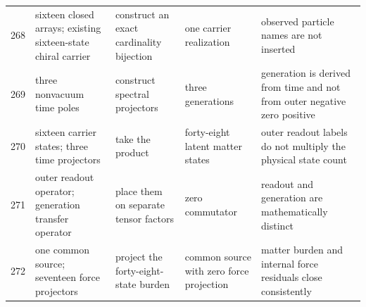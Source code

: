 \documentclass[11pt]{article}
\numberwithin{equation}{section}
\theoremstyle{remark}
\begin{document}
\begin{landscape}
\begin{longtable}{p{0.65cm}p{3.5cm}p{4.0cm}p{4.0cm}p{4.6cm}}
268&sixteen closed arrays; existing sixteen-state chiral carrier&construct an exact cardinality bijection&one carrier realization&observed particle names are not inserted\\
269&three nonvacuum time poles&construct spectral projectors&three generations&generation is derived from time and not from outer negative zero positive\\
270&sixteen carrier states; three time projectors&take the product&forty-eight latent matter states&outer readout labels do not multiply the physical state count\\
271&outer readout operator; generation transfer operator&place them on separate tensor factors&zero commutator&readout and generation are mathematically distinct\\
272&one common source; seventeen force projectors&project the forty-eight-state burden&common source with zero force projection&matter burden and internal force residuals close consistently\\
\bottomrule\end{longtable}

\end{landscape}
\end{document}
